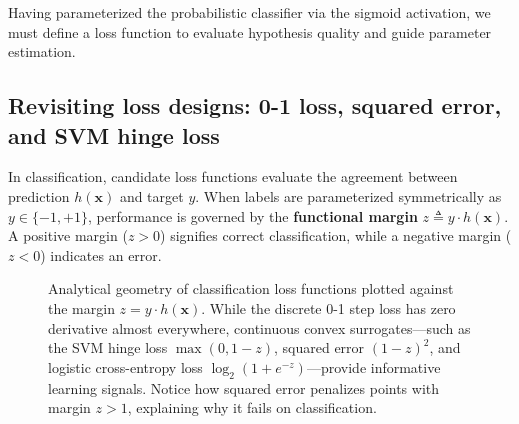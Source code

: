 Having parameterized the probabilistic classifier via the sigmoid activation, we must define a loss function to evaluate hypothesis quality and guide parameter estimation.

\subsection{Revisiting loss designs: 0-1 loss, squared error, and SVM hinge loss}
\label{sec:loss_comparison_review}

In classification, candidate loss functions evaluate the agreement between prediction $h(\mathbf{x})$ and target $y$. When labels are parameterized symmetrically as $y \in \{-1, +1\}$, performance is governed by the \textbf{functional margin} $z \triangleq y \cdot h(\mathbf{x})$. A positive margin ($z > 0$) signifies correct classification, while a negative margin ($z < 0$) indicates an error.

\begin{figure}[htbp]
\centering
{}
\caption{Analytical geometry of classification loss functions plotted against the margin $z = y \cdot h(\mathbf{x})$. While the discrete 0-1 step loss has zero derivative almost everywhere, continuous convex surrogates—such as the SVM hinge loss $\max(0, 1-z)$, squared error $(1-z)^2$, and logistic cross-entropy loss $\log_2(1 + e^{-z})$—provide informative learning signals. Notice how squared error penalizes points with margin $z > 1$, explaining why it fails on classification.}
\label{fig:slide_loss_functions}
\end{figure}

